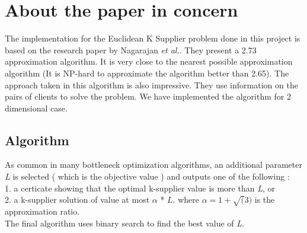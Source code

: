 \documentclass[12pt, a4paper]{article}
\newcommand{\etal}{\textit{et al.}}
\begin{document}
\section{About the paper in concern}
The implementation for the Euclidean K Supplier problem done in this project is based on the research paper by Nagarajan \etal \cite{EuclideanKS}. They present a 2.73 approximation algorithm. It is very close to the nearest possible approximation algorithm (It is NP-hard to approximate the algorithm better than 2.65). The approach taken in this algorithm is also impressive. They use information on the pairs of clients to solve the problem. We have implemented the algorithm for 2 dimensional case.\\

\subsection{Algorithm}
As common in many bottleneck optimization algorithms, an additional parameter \textit{L} is selected ( which is the objective value ) and outputs one of the following :\\
 1. a certicate showing that the optimal k-supplier value is more than \textit{L}, or \\
 2. a k-supplier solution of value at most $\alpha$ * $\textit{L}$. where $ \alpha = 1+\sqrt(3)$ is the approximation ratio. \\
The final algorithm uses binary search to find the best value of \textit{L}. \\
 
\end{document}
